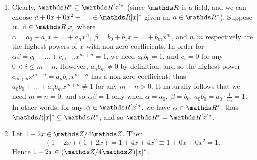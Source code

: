 \documentclass{homework}
\begin{document}
\begin{solution}
\begin{enumerate}[label=(\alph*)]
\begin{proof}[Proof]
        From this, we can also clearly see that $s_n$ is strictly increasing: for any $n\in \N$,
        $(1+\sqrt{2})^n=a+b\sqrt{2}<(a+2b)+(a+b)\sqrt{2}=(1+\sqrt{2})^{n+1}$, so $s_n < s_{n+1}$, as
        required\footnote{Many thanks to MATH1010 and Tamarkin Assistant Professor Huy Quang Nguyen
        for his illuminating insights into sequences.}.
      \end{proof}

      Now, since $(1+\sqrt{2})^n<(1+\sqrt{2})^{n+1}$, it naturally follows that for any $j,k\in \N$,
      $j\neq k$ (supposing without loss of generality that $j<k$), $(1+\sqrt{2})^j\neq
      (1+\sqrt{2})^k$, and so all $(1+\sqrt{2})^n$ are different for $n\in \N$ (in other words,
      there are infinitely many $\alpha\in \Z[\sqrt{2}]$). Moreover, for any $(1+\sqrt{2})^n$, we
      have $(1+\sqrt{2})^n(-1+\sqrt{2})^n=1$, since $(1+\sqrt{2})(-1+\sqrt{2})=1$. Thus any
      $(1+\sqrt{2})^n\in \Z[\sqrt{2}]^*$; and since there are infinitely many $(1+\sqrt{2})^n$,
      there are infinitely many elements in $\Z[\sqrt{2}]^*$.

    \item Clearly, $\R^*\subseteq \R[x]^*$ (since $\R$ is a field, and we can choose
      $a+0x+0x^2+\ldots\in \R[x]^*$ given an $a\in \R^*$). Suppose $\alpha,\ \beta\in \R[x]$ where
      $\alpha=a_0+a_1x+\ldots+a_nx^n,\ \beta=b_0+b_1x+\ldots+b_mx^m$, and $n,m$ respectively are the
      highest powers of $x$ with non-zero coefficients. In order for
      $\alpha\beta=c_0+\ldots+c_{m+n}x^{m+n}=1$, we need $ a_0b_0=1$, and $c_i=0$ for any $0<i\le m+n$.
      However, $a_nb_m\neq 0$ by definition, and so the highest power $c_{m+n}x^{m+n}=a_nb_mx^{m+n}$
      has a non-zero coefficient; thus $a_0b_0+\ldots+a_nb_mx^{m+n}\neq 1$ for any $m+n>0$. It
      naturally follows that we need $m=n=0$, and so $\alpha\beta=1$ only when $\alpha=a_0,\ \beta=b_0$,
      $a_0b_0=a_0\cdot \frac{1}{a_0}=1$. In other words, for any $\alpha\in \R[x]^*$, we have
      $\alpha\in \R^*$; thus $\R[x]^*\subseteq \R^*$, and so $\R^*=\R[x]^*$.
    \item Let $1+2x\in \Z / 4\Z$. Then  \[
      (1+2x)(1+2x)=1+4x+4x^2\equiv 1+0x+0x^2=1
    .\] Hence $1+2x\in (\Z / 4\Z)[x]^*$.
  \end{enumerate}
\end{solution}
\end{document}
